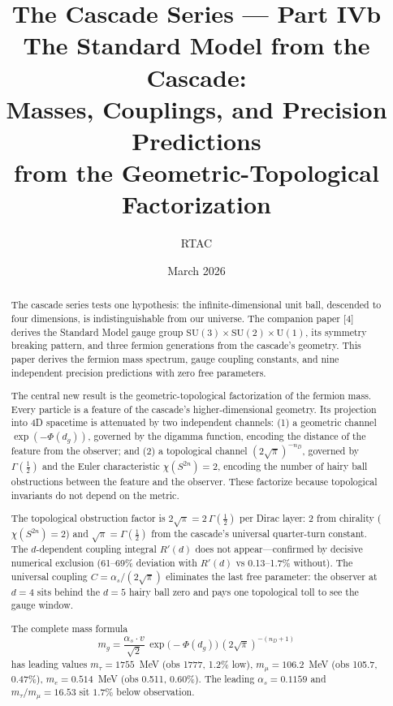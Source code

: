 \documentclass[12pt,a4paper]{article}
\title{\textbf{The Cascade Series --- Part IVb}\\[6pt]
The Standard Model from the Cascade:\\
Masses, Couplings, and Precision Predictions\\
from the Geometric-Topological Factorization}
\author{RTAC}
\date{March 2026}
\begin{document}
\setlength{\emergencystretch}{3em}
\maketitle
{}
\label{paperdoc}

\begin{abstract}
The cascade series tests one hypothesis: the infinite-dimensional unit ball, descended to four dimensions, is indistinguishable from our universe. The companion paper [4] derives the Standard Model gauge group $\text{SU}(3) \times \text{SU}(2) \times \text{U}(1)$, its symmetry breaking pattern, and three fermion generations from the cascade's geometry. This paper derives the fermion mass spectrum, gauge coupling constants, and nine independent precision predictions with zero free parameters.

The central new result is the geometric-topological factorization of the fermion mass. Every particle is a feature of the cascade's higher-dimensional geometry. Its projection into 4D spacetime is attenuated by two independent channels: (1) a geometric channel $\exp(-\Phi(d_g))$, governed by the digamma function, encoding the distance of the feature from the observer; and (2) a topological channel $(2\sqrt{\pi})^{-n_D}$, governed by $\Gamma(\tfrac{1}{2})$ and the Euler characteristic $\chi(S^{2n}) = 2$, encoding the number of hairy ball obstructions between the feature and the observer. These factorize because topological invariants do not depend on the metric.

The topological obstruction factor is $2\sqrt{\pi} = 2\,\Gamma(\tfrac{1}{2})$ per Dirac layer: 2 from chirality ($\chi(S^{2n}) = 2$) and $\sqrt{\pi} = \Gamma(\tfrac{1}{2})$ from the cascade's universal quarter-turn constant. The $d$-dependent coupling integral $R'(d)$ does not appear---confirmed by decisive numerical exclusion (61--69\% deviation with $R'(d)$ vs 0.13--1.7\% without). The universal coupling $C = \alpha_s/(2\sqrt{\pi})$ eliminates the last free parameter: the observer at $d = 4$ sits behind the $d = 5$ hairy ball zero and pays one topological toll to see the gauge window.

The complete mass formula
\[
m_g = \frac{\alpha_s \cdot v}{\sqrt{2}}\,\exp\!\bigl(-\Phi(d_g)\bigr)\,(2\sqrt{\pi})^{-(n_D+1)}
\]
has leading values $m_\tau = 1755$~MeV (obs 1777, 1.2\% low), $m_\mu = 106.2$~MeV (obs 105.7, 0.47\%), $m_e = 0.514$~MeV (obs 0.511, 0.60\%). The leading $\alpha_s = 0.1159$ and $m_\tau/m_\mu = 16.53$ sit $1.7\%$ below observation.


\end{abstract}
\end{document}
